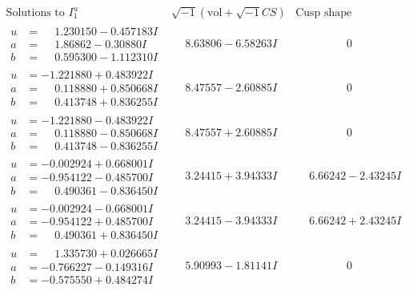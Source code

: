 \documentclass[1p]{elsarticle_modified}
\theoremstyle{definition}
\newcommand{\I}{\sqrt{-1}}
\begin{document}
$$\begin{array}{c|c|c}
\text{Solutions to }I^u_{1}& \I (\text{vol} + \sqrt{-1}CS) & \text{Cusp shape}\\
 \hline 
\begin{aligned}
u &= \phantom{-}1.230150 - 0.457183 I \\
a &= \phantom{-}1.86862 - 0.30880 I \\
b &= \phantom{-}0.595300 - 1.112310 I\end{aligned}
 & \phantom{-}8.63806 - 6.58263 I & \phantom{-0.000000 } 0 \\ \hline\begin{aligned}
u &= -1.221880 + 0.483922 I \\
a &= \phantom{-}0.118880 + 0.850668 I \\
b &= \phantom{-}0.413748 + 0.836255 I\end{aligned}
 & \phantom{-}8.47557 - 2.60885 I & \phantom{-0.000000 } 0 \\ \hline\begin{aligned}
u &= -1.221880 - 0.483922 I \\
a &= \phantom{-}0.118880 - 0.850668 I \\
b &= \phantom{-}0.413748 - 0.836255 I\end{aligned}
 & \phantom{-}8.47557 + 2.60885 I & \phantom{-0.000000 } 0 \\ \hline\begin{aligned}
u &= -0.002924 + 0.668001 I \\
a &= -0.954122 - 0.485700 I \\
b &= \phantom{-}0.490361 - 0.836450 I\end{aligned}
 & \phantom{-}3.24415 + 3.94333 I & \phantom{-}6.66242 - 2.43245 I \\ \hline\begin{aligned}
u &= -0.002924 - 0.668001 I \\
a &= -0.954122 + 0.485700 I \\
b &= \phantom{-}0.490361 + 0.836450 I\end{aligned}
 & \phantom{-}3.24415 - 3.94333 I & \phantom{-}6.66242 + 2.43245 I \\ \hline\begin{aligned}
u &= \phantom{-}1.335730 + 0.026665 I \\
a &= -0.766227 - 0.149316 I \\
b &= -0.575550 + 0.484274 I\end{aligned}
 & \phantom{-}5.90993 - 1.81141 I & \phantom{-0.000000 } 0 \\ \hline\begin{aligned}

\end{aligned}
\end{array}$$
\end{document}
